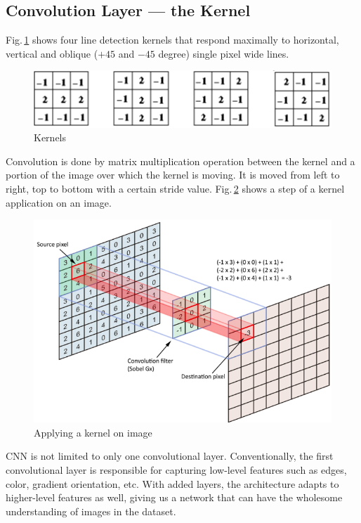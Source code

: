 \subsection{Convolution Layer — the Kernel}
\label{backgournd_cnn}

Fig.\,\ref{kernels} shows four line detection kernels that respond maximally to horizontal, vertical and oblique ($+45$ and $-45$ degree) single pixel wide lines.

\begin{figure}[h]
	\centering
	\includegraphics[scale=0.6]{Figs/kernels.png}
    \caption{Kernels}
    \label{kernels}
\end{figure}

Convolution is done by matrix multiplication operation between the kernel and a portion of the image over which the kernel is moving. It is moved from left to right, top to bottom with a certain stride value. Fig.\,\ref{convlayer} shows a step of a kernel application on an image. 

\begin{figure}[h]
	\centering
	\includegraphics[scale=0.4]{Figs/convlayer.png}
    \caption{Applying a kernel on image \citep{towarddata}}
    \label{convlayer}
\end{figure}


CNN is not limited to only one convolutional layer. Conventionally, the first convolutional layer is responsible for capturing low-level features such as edges, color, gradient orientation, etc. With added layers, the architecture adapts to higher-level features as well, giving us a network that can have the wholesome understanding of images in the dataset.

